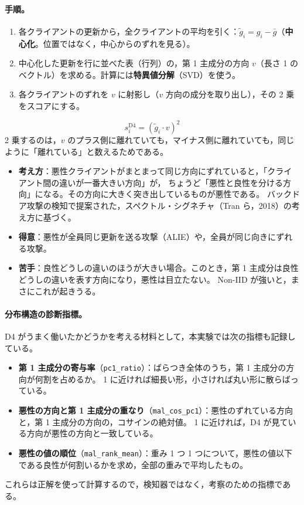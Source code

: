 \documentclass[a4j, dvipdfmx]{jsarticle}  %
\begin{document}
\paragraph{手順。}
\begin{enumerate}
  \item 各クライアントの更新から，全クライアントの平均を引く：$\tilde{g}_i = g_i - \bar{g}$（\textbf{中心化}。位置ではなく，中心からのずれを見る）。
  \item 中心化した更新を行に並べた表（行列）の，第 1 主成分の方向 $v$（長さ 1 のベクトル）を求める。計算には\textbf{特異値分解}（SVD）を使う。
  \item 各クライアントのずれを $v$ に射影し（$v$ 方向の成分を取り出し），その 2 乗をスコアにする。
\end{enumerate}
\begin{equation}
  s_i^{\mathrm{D4}} = (\tilde{g}_i \cdot v)^2
\end{equation}
2 乗するのは，$v$ のプラス側に離れていても，マイナス側に離れていても，同じように「離れている」と数えるためである。

\begin{itemize}
  \item \textbf{考え方}：悪性クライアントがまとまって同じ方向にずれていると，「クライアント間の違いが一番大きい方向」が，
        ちょうど「悪性と良性を分ける方向」になる。その方向に大きく突き出しているものが悪性である。
        バックドア攻撃の検知で提案された，スペクトル・シグネチャ（Tran ら，2018）の考え方に基づく。
  \item \textbf{得意}：悪性が全員同じ更新を送る攻撃（ALIE）や，全員が同じ向きにずれる攻撃。
  \item \textbf{苦手}：良性どうしの違いのほうが大きい場合。このとき，第 1 主成分は良性どうしの違いを表す方向になり，悪性は目立たない。
        Non-IID が強いと，まさにこれが起きうる。
\end{itemize}

\paragraph{分布構造の診断指標。}
D4 がうまく働いたかどうかを考える材料として，本実験では次の指標も記録している。
\begin{itemize}
  \item \textbf{第 1 主成分の寄与率}（\texttt{pc1\_ratio}）：ばらつき全体のうち，第 1 主成分の方向が何割を占めるか。
        1 に近ければ細長い形，小さければ丸い形に散らばっている。
  \item \textbf{悪性の方向と第 1 主成分の重なり}（\texttt{mal\_cos\_pc1}）：悪性のずれている方向と，第 1 主成分の方向の，コサインの絶対値。
        1 に近ければ，D4 が見ている方向が悪性の方向と一致している。
  \item \textbf{悪性の値の順位}（\texttt{mal\_rank\_mean}）：重み 1 つ 1 つについて，悪性の値以下である良性が何割いるかを求め，全部の重みで平均したもの。
\end{itemize}
これらは正解を使って計算するので，検知器ではなく，考察のための指標である。
\end{document}

